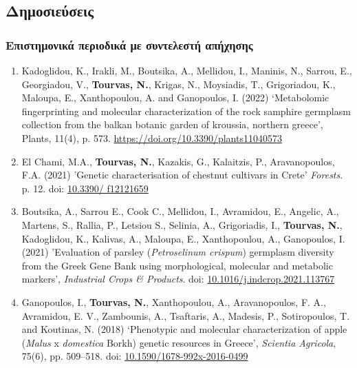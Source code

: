 \documentclass[12pt,]{scrartcl}
\begin{document}
\subsection{Δημοσιεύσεις}\label{publications}

\subsubsection{Επιστημονικά περιοδικά με συντελεστή απήχησης}\label{journals}
\vspace{-3mm}
\begin{enumerate}

\leftskip-0.07in

\item Kadoglidou, K., Irakli, M., Boutsika, A., Mellidou, I., Maninis, N., Sarrou, E., Georgiadou, V., \textbf{Tourvas, N.}, Krigas, N., Moysiadis, T., Grigoriadou, K., Maloupa, E., Xanthopoulou, A. and Ganopoulos, I. (2022) ‘Metabolomic fingerprinting and molecular characterization of the rock samphire germplasm collection from the balkan botanic garden of kroussia, northern greece’, Plants, 11(4), p. 573. \href{Available at: https://doi.org/10.3390/plants11040573}{https://doi.org/10.3390/plants11040573}

\item El Chami, M.A., \textbf{Tourvas, N.}, Kazakis, G., Kalaitzis, P., Aravanopoulos, F.A. (2021) 'Genetic characterisation of chestnut cultivars in Crete' \textit{Forests}. p. 12. doi: \href{https://doi.org/10.3390/f12121659}{10.3390/ 
f12121659}

\item Boutsika, A., Sarrou E., Cook C., Mellidou, I., Avramidou, E., Angelic, A., Martens, S., Rallia, P., Letsiou S., Selinia, A., Grigoriadis, I., \textbf{Tourvas, N.}, Kadoglidou, K., Kalivas, A., Maloupa, E., Xanthopoulou, A., Ganopoulos, I. (2021) 'Evaluation of parsley (\textit{Petroselinum crispum}) germplasm diversity from the Greek Gene Bank using morphological, molecular and metabolic markers', \textit{Industrial Crops \& Products}. doi: \href{https://doi.org/10.1016/j.indcrop.2021.113767}{10.1016/j.indcrop.2021.113767}

\item Ganopoulos, I., \textbf{Tourvas, N.}, Xanthopoulou, A., Aravanopoulos, F. A., Avramidou, E. V., Zambounis, A., Tsaftaris, A., Madesis, P., Sotiropoulos, T. and Koutinas, N. (2018) ‘Phenotypic and molecular characterization of apple (\textit{Malus} x \textit{domestica} Borkh) genetic resources in Greece’, \textit{Scientia Agricola}, 75(6), pp. 509–518. doi: \href{http://dx.doi.org/10.1590/1678-992x-2016-0499}{10.1590/1678-992x-2016-0499}

\end{enumerate}
\end{document}
